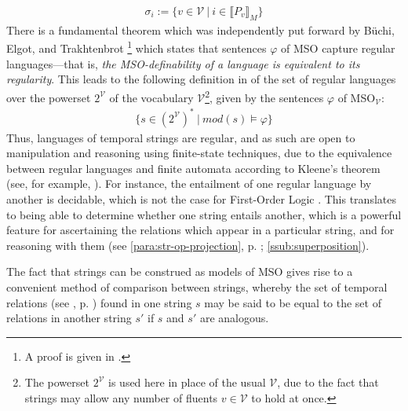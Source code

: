 \documentclass[a4paper,12pt,leqno]{article}
\newcommand{\V}{\mathcal{V}}
\renewcommand{\phi}{\varphi}
\newcommand{\selfnote}[1]{{\color{red}[NB\footnote{{\color{red}#1}}]}}
\newcommand{\nb}{\selfnote}
\begin{document}
\begin{align}
	\sigma_i := \{v \in \V ~|~ i \in \llbracket P_v \rrbracket_M \}
\end{align}
There is a fundamental theorem which was independently put forward by B\"{u}chi, Elgot, and Trakhtenbrot \cite[p. 30]{fernando2016regular}\footnote{A proof is given in \citet[p.124, Theorem 7.21]{Libkin2004}.} which states that sentences $\phi$ of MSO capture regular languages---that is, \textit{the MSO-definability of a language is equivalent to its regularity}. This leads to the following definition in \citet[p. 35]{Fernando2018} of the set of regular languages over the powerset $2^{\V}$ of the vocabulary $\V$\footnote{The powerset $2^{\V}$ is used here in place of the usual $\V$, due to the fact that strings may allow any number of fluents $v \in \V$ to hold at once.}, given by the sentences $\phi$ of MSO$_{\V}$:
\begin{align}\label{def:mso-regularity}
	\{s \in (2^{\V})^* ~|~ mod(s) \models \phi \}
\end{align}
Thus, languages of temporal strings are regular, and as such are open to manipulation and reasoning using finite-state techniques, due to the equivalence between regular languages and finite automata according to Kleene's theorem (see, for example, \citet[p. 41]{yu1997regular}). For instance, the entailment of one regular language by another is decidable, which is not the case for First-Order Logic \citep{trakhtenbrot1953recursive,elgot1966decidability}. This translates to being able to determine whether one string entails another, which is a powerful feature for ascertaining the relations which appear in a particular string, and for reasoning with them (see \cref{para:str-op-projection}, p. \pageref{para:str-op-projection}; \cref{ssub:superposition}).

The fact that strings can be construed as models of MSO gives rise to a convenient method of comparison between strings, whereby the set of temporal relations (see , p. \pageref{tab:allen-rels-strings}) found in one string $s$ may be said to be equal to the set of relations in another string $s'$ if $s$ and $s'$ are analogous.
\end{document}
